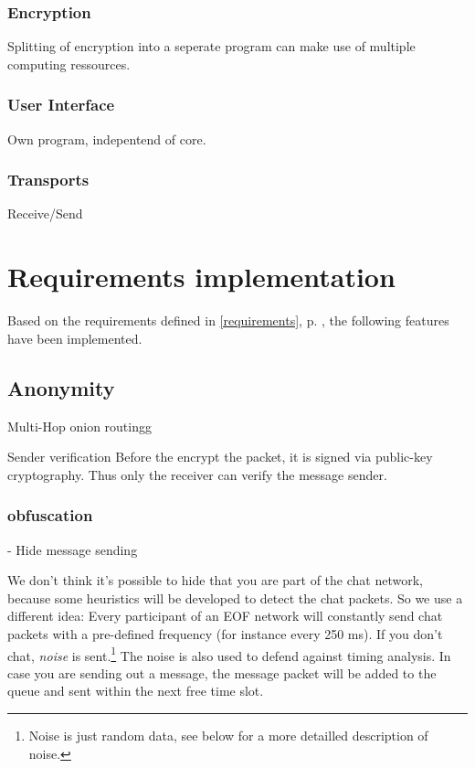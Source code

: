 \subsubsection{Encryption}
Splitting of encryption into a seperate program can make use of
multiple computing ressources.
\subsubsection{User Interface}
Own program, indepentend of core.
\subsubsection{Transports}
Receive/Send


\section{Requirements implementation}
Based on the requirements defined in \ref{requirements}, 
p. \pageref{requirements}, the following features have been implemented. 

\subsection{Anonymity}
Multi-Hop onion routingg

Sender verification
Before the encrypt the packet, it is signed via public-key
cryptography\cite{pgp-1}. Thus only the receiver can verify the message sender.

\subsubsection{obfuscation}
- Hide message sending 

We don't think it's possible to hide that you are part of the chat network,
because some heuristics will be developed to detect the chat packets.
So we use a different idea:
Every participant of an EOF network will constantly send chat packets
with a pre-defined frequency (for instance every 250 ms). 
If you don't chat, \emph{noise} is sent.\footnote{Noise is just random
data, see below for a more detailled description of noise.}
The noise is also used to defend against timing analysis.
In case you are sending out a message, the message packet will be added to the
queue and sent within the next free time slot.

